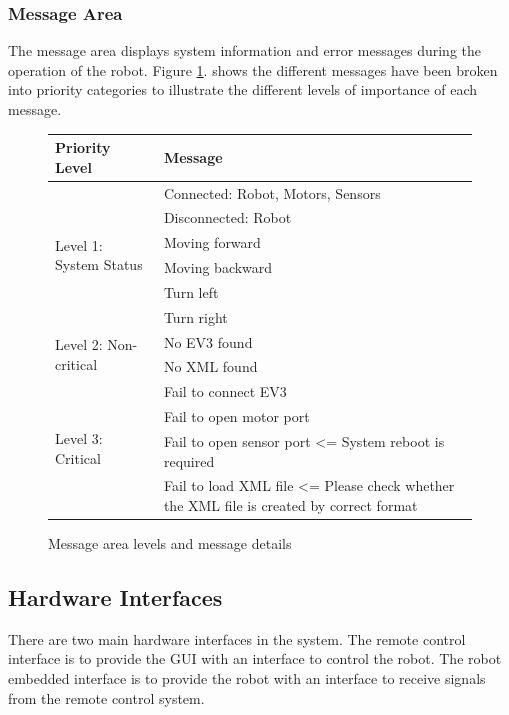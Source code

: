 \documentclass[10pt,a4paper,titlepage]{article}
\begin{document}
	\subsubsection*{Message Area}
	The message area displays system information and error messages during the operation of the robot. Figure \ref{fig:message display details}. shows the different messages have been broken into priority categories to illustrate the different levels of importance of each message.
	
	\begin{figure}
		\centering
		\begin{tabular}{|p{4cm}|p{6cm}|}
			\hline 
			\textbf{Priority Level} &\textbf{Message} \\ \hline 
			\multirow{6}{*}{Level 1: System Status} 
			& Connected: Robot, Motors, Sensors \\ \cline{2-2}
			& Disconnected: Robot \\ \cline{2-2}
			& Moving forward \\ \cline{2-2}
			& Moving backward \\ \cline{2-2}
			& Turn left \\ \cline{2-2}
			& Turn right \\ 
			\hline 
			\multirow{2}{*}{Level 2: Non-critical} 
			& No EV3 found \\ \cline{2-2}
			& No XML found \\ 
			\hline 
			\multirow{4}{*}{Level 3: Critical} 
			& Fail to connect EV3 \\ \cline{2-2}
			& Fail to open motor port \\ \cline{2-2}
			& Fail to open sensor port <= System reboot is required \\ \cline{2-2}
			& Fail to load XML file <= Please check whether the XML file is created by correct format \\ 
			\hline 
		\end{tabular} 
		\caption{Message area levels and message details}
		\label{fig:message display details}
	\end{figure}
	
	\subsection{Hardware Interfaces}
	There are two main hardware interfaces in the system. The remote control interface is to provide the GUI with an interface to control the robot. The robot embedded interface is to provide the robot with an interface to receive signals from the remote control system.
	
\end{document}
